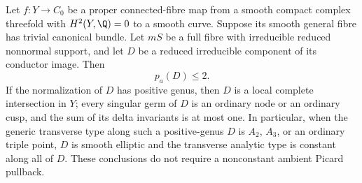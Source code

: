 
\begin{proposition}\label{cdp:st:A.5.14}
Let $f:Y\to C_0$ be a proper connected-fibre map from a
smooth compact complex threefold with $H^2(Y,\Q)=0$ to
a smooth curve. Suppose its smooth general fibre has
trivial canonical bundle. Let $mS$ be a full fibre with
irreducible reduced nonnormal support, and let $D$ be
a reduced irreducible component of its conductor image.
Then
\[
                         p_a(D)\le2.                \tag{A.J.30}\label{cdp:eq:A.J.30}
\]
If the normalization of $D$ has positive genus, then
$D$ is a local complete intersection in $Y$; every
singular germ of $D$ is an ordinary node or an ordinary
cusp, and the sum of its delta invariants is at most
one. In particular, when the generic transverse type
along such a positive-genus $D$ is $A_2$, $A_3$, or an
ordinary triple point, $D$ is smooth elliptic and the
transverse analytic type is constant along all of $D$.
These conclusions do not require a nonconstant ambient
Picard pullback.
\end{proposition}
